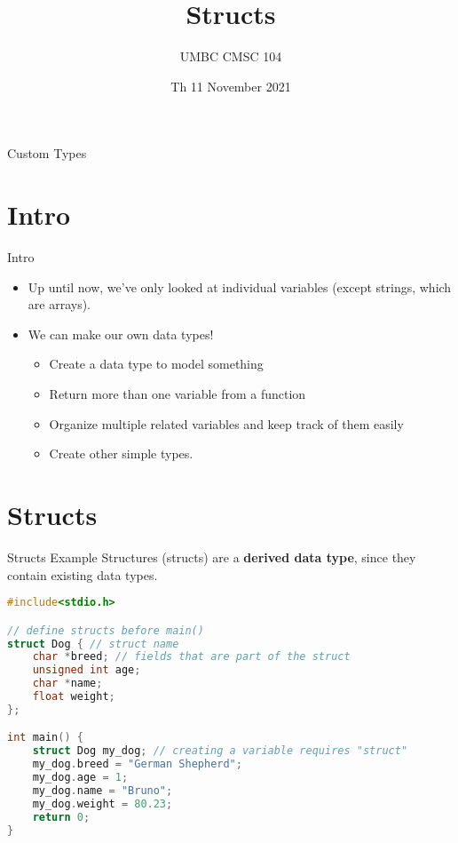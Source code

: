 \documentclass[graphics]{beamer}
\title{Structs}
\author{UMBC CMSC 104}
\date{Th 11 November 2021}
\begin{document}
\begin{frame}{}
\centering
    Custom Types
\end{frame}

\frame{\tableofcontents}

\section{Intro}
\begin{frame}{Intro}
    \begin{itemize}
        \item Up until now, we've only looked at individual variables (except strings, which are arrays).
        \item We can make our own data types!
        \begin{itemize}
            \item Create a data type to model something
            \item Return more than one variable from a function
            \item Organize multiple related variables and keep track of them easily
            \item Create other simple types.
        \end{itemize}
    \end{itemize}
\end{frame}

\section{Structs}
\begin{frame}[fragile]{Structs Example}
    Structures (structs) are a \textbf{derived data type}, since they contain existing data types.
    \begin{lstlisting}[language=C,basicstyle=\footnotesize,keywordstyle=\color{blue},commentstyle=\color{green},showstringspaces=false,stringstyle=\color{red}]
#include<stdio.h>

// define structs before main()
struct Dog { // struct name
    char *breed; // fields that are part of the struct
    unsigned int age;
    char *name;
    float weight;
};

int main() {
    struct Dog my_dog; // creating a variable requires "struct"
    my_dog.breed = "German Shepherd";
    my_dog.age = 1;
    my_dog.name = "Bruno";
    my_dog.weight = 80.23;
    return 0;
}
    \end{lstlisting}
\end{frame}
\end{document}
